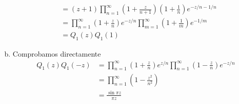 \documentclass[twoside]{article}
\begin{document}
\begin{solucion}
\begin{enumerate}[a)]
\begin{align*}
&=(z+1)\prod_{n=1}^\infty\left(1+\frac{z}{n+1}\right)\left(1+\frac{1}{n}\right)e^{-z/n - 1/n}\\
&=\prod_{n=1}^\infty \left(1+\frac{z}{n}\right)e^{-z/n}\prod_{m=1}^\infty \left(1+\frac{1}{m}\right)e^{-1/m}\\
&=Q_1(z)Q_1(1)
\end{align*}
\item Comprobamos directamente
\begin{align*}
Q_1(z)Q_1(-z) &= \prod_{n=1}^\infty \left(1+\frac{z}{n}\right)e^{z/n}\prod_{n=1}^\infty \left(1-\frac{z}{n}\right)e^{-z/n}\\
&= \prod_{n=1}^\infty \left(1-\frac{z^2}{n^2}\right)\\
&=\frac{\sin \pi z}{\pi z}
\end{align*}
\end{enumerate}
\end{solucion}
\end{document}
